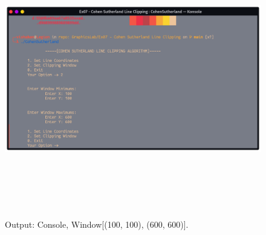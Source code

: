 \documentclass[12pt, a4]{article}
\begin{document}
\subsection*{}
\begin{figure}[h]
\centering
\caption{Output: Console, Window[(100, 100), (600, 600)].}
\includegraphics[height=12cm, width=17cm]{Outputs/Console-2.png}
\end{figure}

\newpage
\end{document}

